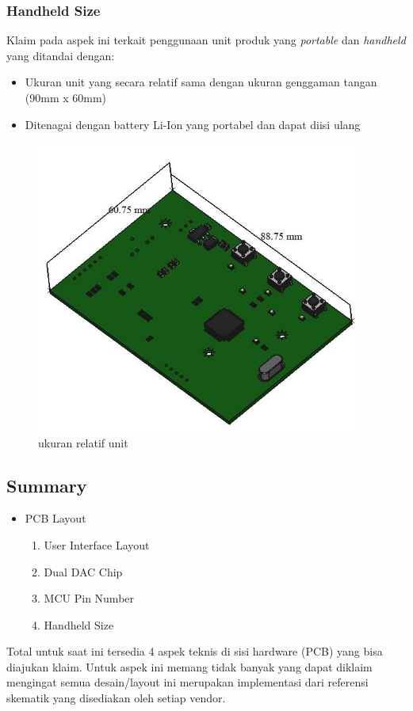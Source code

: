 \documentclass[12pt,]{article}
\begin{document}
	\subsubsection{Handheld Size}
	
	Klaim pada aspek ini terkait penggunaan unit produk yang \textit{portable}
	dan \textit{handheld} yang ditandai dengan:
	
	\begin{itemize}
		\item Ukuran unit yang secara relatif sama dengan ukuran genggaman 
		tangan (90mm x 60mm)
		
		\item Ditenagai dengan battery Li-Ion yang portabel dan dapat diisi 
		ulang
	\end{itemize}

	\begin{figure}[!ht]
		\centering
		\includegraphics[width=300pt]{images/size}
		\caption{ukuran relatif unit}
	\end{figure}

	\newpage
	\subsection{Summary}
	
	\begin{itemize}
		\item PCB Layout
		\begin{enumerate}
			\item User Interface Layout
			\item Dual DAC Chip
			\item MCU Pin Number
			\item Handheld Size
		\end{enumerate}
	\end{itemize}

	Total untuk saat ini tersedia 4 aspek teknis di sisi hardware (PCB) yang bisa diajukan klaim.
	Untuk aspek ini memang tidak banyak yang dapat diklaim mengingat semua desain/layout ini merupakan implementasi
	dari referensi skematik yang disediakan oleh setiap vendor.
	
\end{document}
